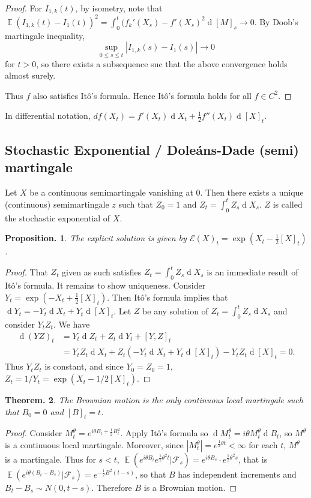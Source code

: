 \documentclass[11pt, a4paper]{memoir}
\theoremstyle{change}
\newtheorem{theorem}{Theorem.}[section]
\newtheorem{proposition}[theorem]{Proposition.}
\theoremstyle{plain}
\theoremstyle{nonumberplain}
\newtheorem{proof}{Proof}
\DeclareMathOperator{\E}{{\mathbb{E}}}
\renewcommand{\d}[1]{\ensuremath{\operatorname{d}\!{#1}}}
\numberwithin{equation}{section}
\begin{document}
\begin{proof}
    For $I_{1,k}(t)$, by isometry, note that $\E(I_{1,k}(t)-I_1(t))^2=\int_0^t(f_k'(X_s)-f'(X_s)^2\d{[M]_s}\to 0$.
    By Doob's martingale inequality,
    \begin{equation*}
        \sup_{0\leq s\leq t}|I_{1,k}(s)-I_1(s)|\to 0
    \end{equation*}
    for $t>0$, so there exists a subsequence suc that the above convergence holds almost surely.

    Thus $f$ also satisfies Itô's formula.
    Hence Itô's formula holds for all $f\in C^2$.
\end{proof}
In differential notation, $df(X_t)=f'(X_t)\d{X_t}+\frac{1}{2}f''(X_t)\d{[X]_t}$.
\subsection{Stochastic Exponential / Doleáns-Dade (semi) martingale}
Let $X$ be a continuous semimartingale vanishing at $0$.
Then there exists a unique (continuous) semimartingale $z$ such that $Z_0=1$ and $Z_t=\int_0^tZ_s\d{X_s}$.
$Z$ is called the stochastic exponential of $X$.
\begin{proposition}
    The explicit solution is given by $\mathcal{E}(X)_t=\exp(X_t-\frac{1}{2}[X]_t)$.
\end{proposition}
\begin{proof}
    That $Z_t$ given as such satisfies $Z_t=\int_0^t Z_s\d{X_s}$ is an immediate result of Itô's formula.
    It remains to show uniqueness.
    Consider $Y_t=\exp(-X_t+\frac{1}{2}[X]_t)$.
    Then Itô's formula implies that $\d{Y_t}=-Y_t\d{X_t}+Y_t\d{[X]_t}$.
    Let $Z$ be any solution of $Z_t=\int_0^t Z_s\d{X_s}$ and consider $Y_tZ_t$.
    We have
    \begin{align*}
        \d{(YZ)_t} &= Y_t\d{Z_t}+Z_t\d{Y_t}+[Y,Z]_t\\
                   &= Y_tZ_t\d{X_t}+Z_t(-Y_t\d{X_t}+Y_t\d{[X]_t})-Y_tZ_t\d{[X]_t}=0.
    \end{align*}
    Thus $Y_tZ_t$ is constant, and since $Y_0=Z_0=1$, $Z_t=1/Y_t=\exp(X_t-1/2[X]_t)$.
\end{proof}
\begin{theorem}
    The Brownian motion is the only continuous local martingale such that $B_0=0$ and $[B]_t=t$.
\end{theorem}
\begin{proof}
    Consider $M_t^\theta=e^{i\theta B_t+\frac{1}{2}B_t^2}$.
    Apply Itô's formula so $\d{M_t^\theta}=i\theta M_t^\theta\d{B_t}$, so $M^\theta$ is a continuous local martingale.
    Moreover, since $|M_t^\theta|=e^{\frac{1}{2}\theta t}<\infty$ for each $t$, $M^\theta$ is a martingale.
    Thus for $s<t$, $\E(e^{i\theta B_t}e^{\frac{1}{2}\theta^2 t}|\mathcal{F}_s)=e^{i\theta B_s}\cdot e^{\frac{1}{2}\theta^2s}$, that is $\E(e^{i\theta(B_t-B_s)}|\mathcal{F}_s)=e^{-\frac{1}{2}B^2(t-s)}$, so that $B$ has independent increments and $B_t-B_s\sim N(0,t-s)$.
    Therefore $B$ is a Brownian motion.
\end{proof}
\end{document}
